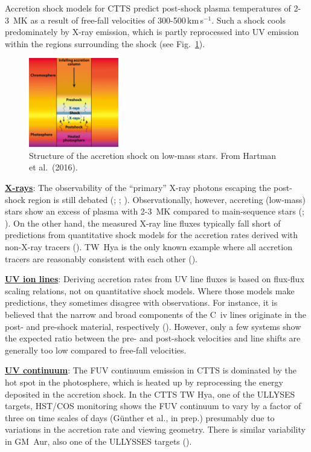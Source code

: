 \documentclass[letterpaper,11pt,twocolumn]{article}
\begin{document}
Accretion shock models for CTTS predict post-shock plasma
temperatures of 2-3~MK as a result of free-fall velocities of 
300-500\,km\,s$^{-1}$. Such a shock cools predominately by
X-ray emission, which is partly reprocessed into UV emission within the regions surrounding the shock (see Fig.~\ref{fig:sketch}). 

\begin{figure}[t!]
\centering
\includegraphics[width=0.35\textwidth]{figs/Hartmann_accretion_sketch.png}
\caption{Structure of the accretion shock on low-mass stars. From Hartman et al.\ (2016).
  \label{fig:sketch}}
\end{figure}

\underline{\bf X-rays}: The observability of the ``primary'' X-ray photons 
escaping the post-shock region is still debated 
(; ; ). Observationally, 
however, accreting (low-mass) stars show  an excess of plasma with 2-3~MK
compared to main-sequence stars (; ).
On the other hand, the measured X-ray line fluxes typically fall short of
predictions from quantitative shock models for the accretion rates derived with non-X-ray tracers (). TW~Hya is the only known example where all accretion tracers are reasonably consistent with each other (). 


\underline{\bf UV ion lines}:  Deriving  accretion rates from UV line fluxes is based 
on flux-flux scaling relations, not on quantitative shock models. Where those models make predictions, they sometimes disagree with observations. For instance, it is believed that the  narrow and 
broad components of the C~{\sc iv} lines  originate in the post- and 
pre-shock material, respectively (). However, only a few systems show the
expected ratio between the pre- and post-shock velocities and line
shifts are generally too low compared to free-fall velocities. 

\underline{\bf UV continuum}: The FUV continuum emission in CTTS is dominated by the hot spot in the photosphere, which is heated up by reprocessing the energy deposited in the accretion shock. In the CTTS TW Hya, one of the ULLYSES targets, HST/COS monitoring shows the FUV continuum to vary by a factor of three on time scales of days (G\"unther et al., in prep.) presumably due to variations in the accretion rate and viewing geometry. There is similar variability in GM~Aur, also one of the ULLYSSES targets ().
\end{document}
